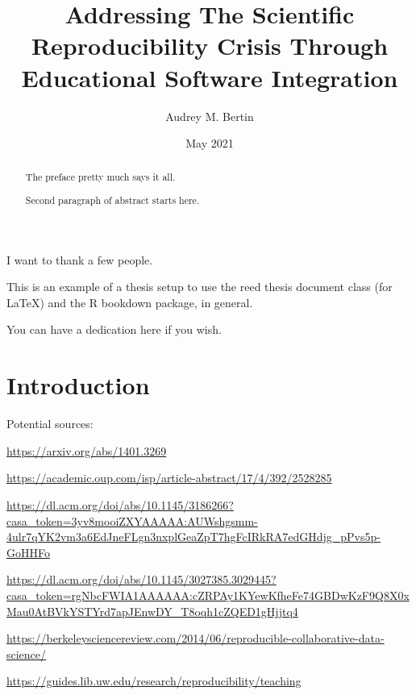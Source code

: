 \documentclass[12pt,twoside]{reedthesis}
\title{Addressing The Scientific Reproducibility Crisis Through Educational
Software Integration}
\author{Audrey M. Bertin}
\date{May 2021}
\begin{document}
  \maketitle

\frontmatter %
\pagestyle{empty} %
  \begin{acknowledgements}
    I want to thank a few people.
  \end{acknowledgements}
  \begin{preface}
    This is an example of a thesis setup to use the reed thesis document
    class (for LaTeX) and the R bookdown package, in general.
  \end{preface}
  \hypersetup{linkcolor=black}
  \setcounter{tocdepth}{2}
  \tableofcontents


  \begin{abstract}
    The preface pretty much says it all. \par
    Second paragraph of abstract starts here.
  \end{abstract}
  \begin{dedication}
    You can have a dedication here if you wish.
  \end{dedication}
\mainmatter %
\pagestyle{fancyplain} %

\chapter*{Introduction}\label{introduction}

Potential sources:

\url{https://arxiv.org/abs/1401.3269}

\url{https://academic.oup.com/isp/article-abstract/17/4/392/2528285}

\url{https://dl.acm.org/doi/abs/10.1145/3186266?casa_token=3yv8mooiZXYAAAAA:AUWshgsmm-4ulr7qYK2vm3a6EdJneFLgn3nxplGeaZpT7hgFcIRkRA7edGHdjg_pPvs5p-GoHHFo}

\url{https://dl.acm.org/doi/abs/10.1145/3027385.3029445?casa_token=rgNbcFWIA1AAAAAA:cZRPAy1KYewKfheFe74GBDwKzF9Q8X0xMau0AtBVkYSTYrd7apJEnwDY_T8oqh1cZQED1gHjjtq4}

\url{https://berkeleysciencereview.com/2014/06/reproducible-collaborative-data-science/}

\url{https://guides.lib.uw.edu/research/reproducibility/teaching}
\end{document}

